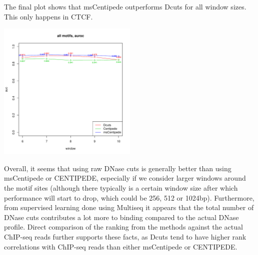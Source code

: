 \documentclass[12pt]{article}
\begin{document}
The final plot shows that msCentipede outperforms Dcuts for all window sizes. This only happens in CTCF.
\begin{center}
\includegraphics[width=0.5\textwidth]{6_mscent_better.pdf}
\end{center}

Overall, it seems that using raw DNase cuts is generally better than using msCentipede or CENTIPEDE, especially if we consider larger windows around the motif sites (although there typically is a certain window size after which performance will start to drop, which could be 256, 512 or 1024bp). Furthermore, from supervised learning done using Multiseq it appears that the total number of DNase cuts contributes a lot more to binding compared to the actual DNase profile. Direct comparison of the ranking from the methods against the actual ChIP-seq reads further supports these facts, as Dcuts tend to have higher rank correlations with ChIP-seq reads than either msCentipede or CENTIPEDE.
\end{document}
